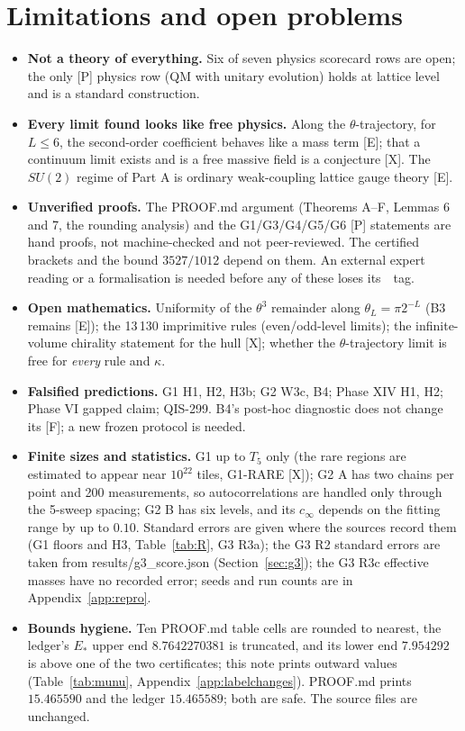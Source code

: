 \documentclass[11pt]{article}
\newcommand\unverifiedtag{\,\fcolorbox{Gray}{white}{\sffamily\scriptsize\textcolor{Gray}{unverified}}}
\begin{document}
\section{Limitations and open problems}\label{sec:limits}
\begin{itemize}
\item \textbf{Not a theory of everything.} Six of seven physics scorecard rows are open; the only [P] physics row (QM with unitary evolution) holds at lattice level and is a standard construction.
\item \textbf{Every limit found looks like free physics.} Along the $\theta$-trajectory, for $L\le6$, the second-order coefficient behaves like a mass term [E]; that a continuum limit exists and is a free massive field is a conjecture [X]. The $SU(2)$ regime of Part A is ordinary weak-coupling lattice gauge theory [E].
\item \textbf{Unverified proofs.} The PROOF.md argument (Theorems A--F, Lemmas 6 and 7, the rounding analysis) and the G1/G3/G4/G5/G6 [P] statements are hand proofs, not machine-checked and not peer-reviewed. The certified brackets and the bound $3527/1012$ depend on them. An external expert reading or a formalisation is needed before any of these loses its \unverifiedtag\ tag.
\item \textbf{Open mathematics.} Uniformity of the $\theta^3$ remainder along $\theta_L=\pi2^{-L}$ (B3 remains [E]); the 13\,130 imprimitive rules (even/odd-level limits); the infinite-volume chirality statement for the hull [X]; whether the $\theta$-trajectory limit is free for \emph{every} rule and $\kappa$.
\item \textbf{Falsified predictions.} G1 H1, H2, H3b; G2 W3c, B4; Phase XIV H1, H2; Phase VI gapped claim; QIS-299. B4's post-hoc diagnostic does not change its [F]; a new frozen protocol is needed.
\item \textbf{Finite sizes and statistics.} G1 up to $T_5$ only (the rare regions are estimated to appear near $10^{22}$ tiles, G1-RARE [X]); G2 A has two chains per point and 200 measurements, so autocorrelations are handled only through the 5-sweep spacing; G2 B has six levels, and its $c_\infty$ depends on the fitting range by up to $0.10$. Standard errors are given where the sources record them (G1 floors and H3, Table~\ref{tab:R}, G3 R3a); the G3 R2 standard errors are taken from results/g3\_score.json (Section~\ref{sec:g3}); the G3 R3c effective masses have no recorded error; seeds and run counts are in Appendix~\ref{app:repro}.
\item \textbf{Bounds hygiene.} Ten PROOF.md table cells are rounded to nearest, the ledger's $E_*$ upper end $8.7642270381$ is truncated, and its lower end $7.954292$ is above one of the two certificates; this note prints outward values (Table~\ref{tab:munu}, Appendix~\ref{app:labelchanges}). PROOF.md prints $15.465590$ and the ledger $15.465589$; both are safe. The source files are unchanged.

\end{itemize}
\end{document}
